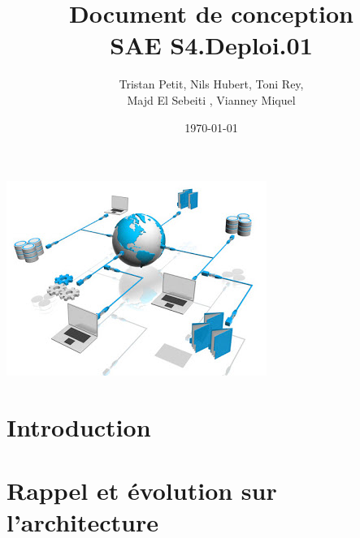 \documentclass{article}
\begin{document}
\title{Document de conception \\ SAE S4.Deploi.01}
\author{Tristan Petit, Nils Hubert, Toni Rey,\\ 
 Majd El Sebeiti , Vianney Miquel}
\date{\today}
\maketitle

\begin{center}
    \vspace{1cm} %
    \includegraphics{Images/Logo-project.jpeg} %
\end{center}

\newpage
{} %
\renewcommand{\contentsname}{Table des matières} %

\tableofcontents 

\newpage




\section{Introduction}



\newpage


\section{Rappel et évolution sur l'architecture}
\end{document}
